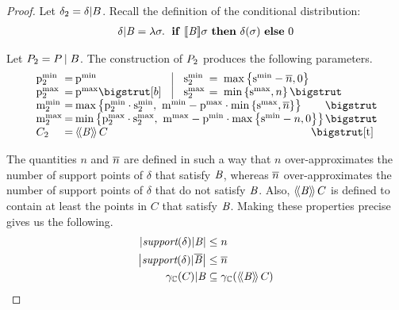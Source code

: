 \newcommand{\supd}[0]{\support{\delta}}
\newcommand{\supin}[0]{\scond{\support{\delta}}{\bexp}}
\newcommand{\supout}[0]{\scondc{\support{\delta}}{\bexp}}

\begin{proof} Let $ \delta_2 = \delta | B $. Recall the
definition of the conditional distribution:
\begin{align*}
\delta | \mathit{B} = \lambda \sigma . \; \text{ \textbf{if} } [\![{\mathit{B}}]\!]{\sigma} \text{ \textbf{then} }
\delta(\sigma) \text{ \textbf{else} } 0
\end{align*}

Let $ P_{2} = P_{} \mid B $. The construction of $ P_{2} $
produces the following parameters.
\[
\setlength{\arraycolsep}{1pt}
\begin{array}{lcl@{\hspace{0.35cm}}|@{\hspace{0.35cm}}lcl}
\pmin{2} &=& \pmin{} &
\smin{2}\ &=&\ \maxparen{\smin{} - \nn, 0}\\
\pmax{2} &=& \pmax{} \bigstrut[b] &
\smax{2} &=&\ \minparen{\smax{}, n} \bigstrut \\
\mmin{2} &=& \multicolumn{4}{l}{\maxparen{\pmin{2} \cdot
    \smin{2},\ \mmin{} - \pmax{} \cdot \minparen{\smax{}, \nn}}} \bigstrut\\
\mmax{2} &=& \multicolumn{4}{l}{\minparen{\pmax{2} \cdot
    \smax{2},\ \mmax{} - \pmin{} \cdot \maxparen{\smin{}-n, 0}}} \bigstrut\\
\getpoly{2} &=& \multicolumn{4}{l}{\abseeval{\bexp}{\getpoly{}}} \bigstrut[t] \\
\end{array}
\]
\vspace{20mm} %

The quantities $ n $ and $ \overline{n} $ are defined in such a way that $ n $
over-approximates the number of support points of $ \delta $ that
satisfy $ \mathit{B} $, whereas $ \overline{n} $ over-approximates the number of support
points of $ \delta $ that do not satisfy $ \mathit{B} $. Also,
$ \langle\!\langle{\mathit{B}}\rangle\!\rangle\,{C_{}} $ is defined to contain at least 
the points in $ C $ that satisfy $ \mathit{B} $. Making these properties
precise gives us the following.
\begin{align}
\label{thm:pp:cond:prop1} \setsize{\supin} & \leq n \\
\label{thm:pp:cond:prop2} \setsize{\supout} & \leq \nn \\
\label{thm:pp:cond:prop3} \scond{\pconc{\getpoly{}}}{\bexp} & \subseteq \pconc{\abseeval{\bexp}{\getpoly{}}}
\end{align}


\end{proof}
